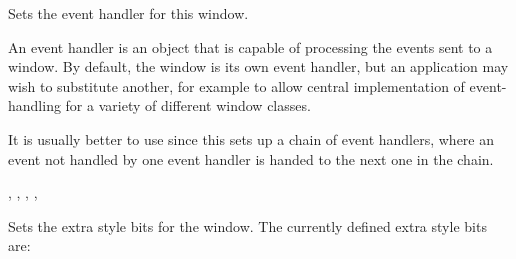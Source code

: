 \label{wxwindowseteventhandler}


Sets the event handler for this window.




An event handler is an object that is capable of processing the events
sent to a window. By default, the window is its own event handler, but
an application may wish to substitute another, for example to allow
central implementation of event-handling for a variety of different
window classes.

It is usually better to use  since
this sets up a chain of event handlers, where an event not handled by one event handler is
handed to the next one in the chain.


,\rtfsp
{},\rtfsp
{},\rtfsp
{},\rtfsp
{}

\label{wxwindowsetextrastyle}


Sets the extra style bits for the window. The currently defined extra style
bits are:

